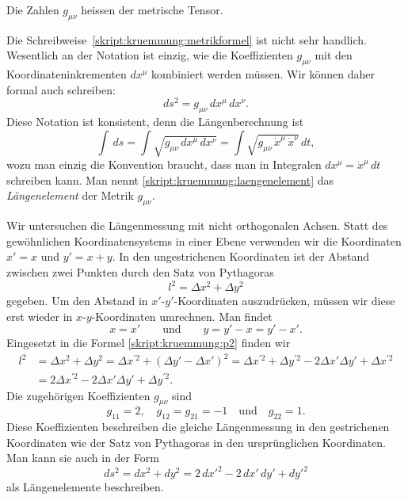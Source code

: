 \begin{definition}
Die Zahlen $g_{\mu\nu}$ heissen der metrische Tensor.
\end{definition}

Die Schreibweise~\eqref{skript:kruemmung:metrikformel} ist nicht
sehr handlich.
Wesentlich an der Notation ist einzig, wie die Koeffizienten $g_{\mu\nu}$
mit den Koordinateninkrementen $dx^\mu$ kombiniert werden müssen.
Wir können daher formal auch schreiben:
\[
ds^2
=
g_{\mu\nu}\,dx^\mu\,dx^\nu.
\]
Diese Notation ist konsistent, denn die Längenberechnung ist
\begin{equation}
\int\,ds
=
\int \sqrt{g_{\mu\nu}\,dx^\mu\,dx^\nu}
=
\int \sqrt{g_{\mu\nu}\,\dot x^\mu\,\dot x^\nu}\,dt,
\label{skript:kruemmung:laengenelement}
\end{equation}
wozu man einzig die Konvention braucht, dass man in Integralen
$dx^\mu=\dot x^\mu\,dt$ schreiben kann.
Man nennt \eqref{skript:kruemmung:laengenelement} das {\em Längenelement}
der Metrik $g_{\mu\nu}$.

%
%
\begin{beispiel}
Wir untersuchen die Längenmessung mit nicht orthogonalen Achsen.
Statt des gewöhnlichen Koordinatensystems in einer Ebene verwenden
wir die Koordinaten $x'=x$ und $y'=x+y$.
In den ungestrichenen Koordinaten ist der Abstand zwischen zwei
Punkten durch den Satz von Pythagoras
\begin{equation}
l^2 = \Delta x^2 + \Delta y^2
\label{skript:kruemmung:p2}
\end{equation}
gegeben.
Um den Abstand in $x'$-$y'$-Koordinaten auszudrücken, müssen wir diese
erst wieder in $x$-$y$-Koordinaten umrechnen. 
Man findet
\[
x=x'
\qquad\text{und}\qquad
y=y'-x=y'-x'.
\]
Eingesetzt in die Formel \eqref{skript:kruemmung:p2} finden wir
\begin{align*}
l^2
&=
\Delta x^2 + \Delta y^2
=
\Delta x^{\prime 2}
+
(\Delta y'- \Delta x')^2
=
\Delta x^{\prime 2}
+
\Delta y^{\prime 2}-2\Delta x'\Delta y' + \Delta x^{\prime 2}
\\
&= 2 \Delta x^{\prime 2} - 2 \Delta x'\Delta y'+\Delta y^{\prime 2}.
\end{align*}
Die zugehörigen Koeffizienten $g_{\mu\nu}$ sind
\[
g_{11} = 2,\quad
g_{12}=g_{21}=-1\quad\text{und}\quad
g_{22}=1.
\]
Diese Koeffizienten beschreiben die gleiche Längenmessung in den 
gestrichenen Koordinaten wie der Satz von Pythagoras in den ursprünglichen
Koordinaten.
Man kann sie auch in der Form
\[
ds^2
=
dx^2+dy^2
=
2\,dx'^2-2\,dx'\,dy'+dy'^2
\]
als Längenelemente beschreiben.
\end{beispiel}

